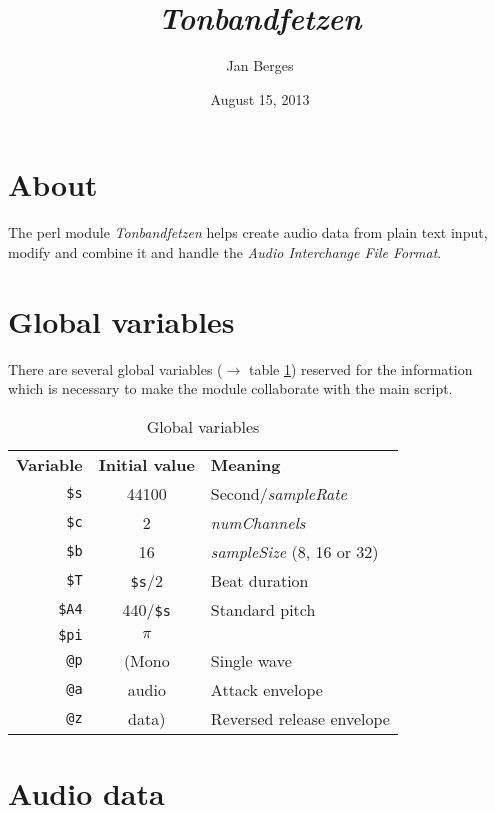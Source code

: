 \documentclass[a4paper, 10pt]{article}
\title{\itshape \ttfamily Tonbandfetzen}
\author{Jan Berges}
\date{August 15, 2013}
\begin{document}
	\maketitle

	\section{About}

	The perl module {\it Tonbandfetzen} helps create audio data from plain text input, modify and combine it and handle the {\it Audio Interchange File Format}.

	\section{Global variables}

	There are several global variables ($\rightarrow$ table \ref{variables}) reserved for the information which is necessary to make the module collaborate with the main script.
	\begin{table}[H]
		\centering
		\begin{tabular}
		    { r            c                     l }
			{\bf Variable} & {\bf Initial value} & {\bf Meaning}                  \\
			{\tt \$s}      & 44100               & Second/{\it sampleRate}        \\
			{\tt \$c}      & 2                   & {\it numChannels}              \\
			{\tt \$b}      & 16                  & {\it sampleSize} (8, 16 or 32) \\
			{\tt \$T}      & {\tt \$s}/2         & Beat duration                  \\
			{\tt \$A4}     & 440/{\tt \$s}       & Standard pitch                 \\
			{\tt \$pi}     & $\pi$               &                                \\
			{\tt @p}       & (Mono               & Single wave                    \\
			{\tt @a}       & audio               & Attack envelope                \\
			{\tt @z}       & data)               & Reversed release envelope
		\end{tabular}
		\caption{Global variables}
		\label{variables}
	\end{table}

	\section{Audio data}
\end{document}
